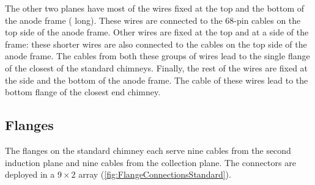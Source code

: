 The other two planes have most of the wires fixed at the top and the bottom of the anode frame
( long).
These wires are connected to the 68-pin cables on the top side of the anode frame.
Other wires are fixed at the top and at a side of the frame:
these shorter wires are also connected to the cables on the top side of the anode frame.
The cables from both these groups of wires lead to the single flange of the closest of the standard chimneys.
Finally, the rest of the wires are fixed at the side and the bottom of the anode frame.
The cable of these wires lead to the bottom flange of the closest end chimney.


\subsection{Flanges}

The flanges on the standard chimney each serve nine cables from the second induction plane
and nine cables from the collection plane.
The connectors are deployed in a $9 \times 2$ array (\cref{fig:FlangeConnectionsStandard}).


